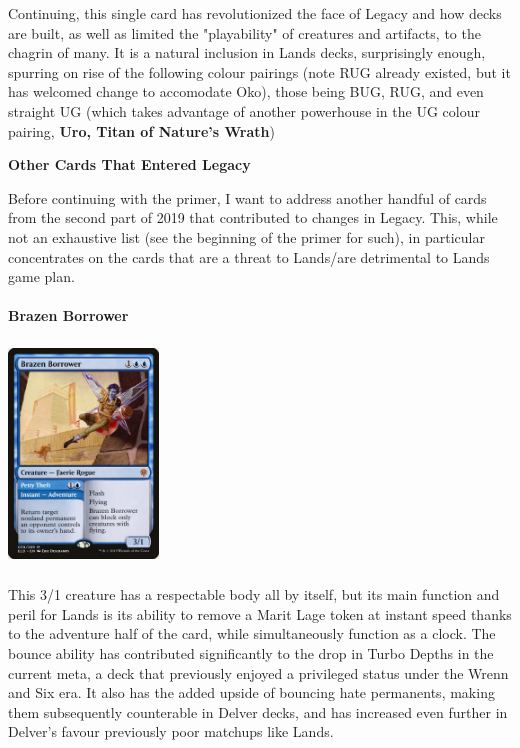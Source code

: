 \documentclass{report}
\begin{document}
Continuing, this single card has revolutionized the face of Legacy and how decks are built, as well as limited the "playability" of creatures and artifacts, to the chagrin of many. It is a natural inclusion in Lands decks, surprisingly enough, spurring on rise of the following colour pairings (note RUG already existed, but it has welcomed change to accomodate Oko), those being BUG, RUG, and even straight UG (which takes advantage of another powerhouse in the UG colour pairing, \textbf{Uro, Titan of Nature's Wrath})\\
\newpage
\begin{center}
\textbf{Other Cards That Entered Legacy}
\end{center}
Before continuing with the primer, I want to address another handful of cards from the second part of 2019 that contributed to changes in Legacy. This, while not an exhaustive list (see the beginning of the primer for such), in particular concentrates on the cards that are a threat to Lands/are detrimental to Lands game plan.\\\\
\textbf{Brazen Borrower}
\begin{center}
\includegraphics [width = 4cm, height = 6cm] {brazen-borrower}
\end{center}
This 3/1 creature has a respectable body all by itself, but its main function and peril for Lands is its ability to remove a Marit Lage token at instant speed thanks to the adventure half of the card, while simultaneously function as a clock. The bounce ability has contributed significantly to the drop in Turbo Depths in the current meta, a deck that previously enjoyed a privileged status under the Wrenn and Six era. It also has the added upside of bouncing hate permanents, making them subsequently counterable in Delver decks, and has increased even further in Delver's favour previously poor matchups like Lands.\\\\
\end{document}
